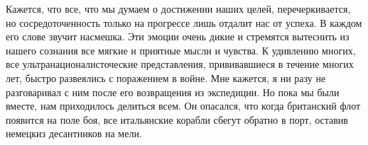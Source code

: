Кажется, что все, что мы думаем о достижении наших целей, перечеркивается, но сосредоточенность только на прогрессе лишь отдалит нас от успеха.
В каждом его слове звучит насмешка.
Эти эмоции очень дикие и стремятся вытеснить из нашего сознания все мягкие и приятные мысли и чувства.
К удивлению многих, все ультранационалисточеские представления, прививавшиеся в течение многих лет, быстро развеялись с поражением в войне.
Мне кажется, я ни разу не разговаривал с ним после его возвращения из экспедиции. Но пока мы были вместе, нам приходилось делиться всем.
Он опасался, что когда британский флот появится на поле боя, все итальянские корабли сбегут обратно в порт, оставив немецкиз десантников на мели.